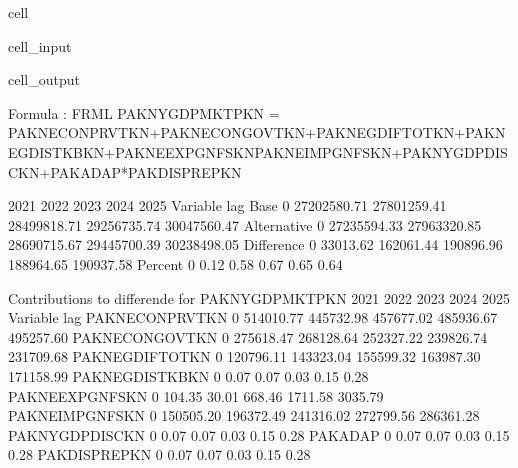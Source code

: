\documentclass[letterpaper,10pt,english]{jupyterBook}
\begin{document}
\begin{sphinxuseclass}{cell}\begin{sphinxVerbatimInput}

\begin{sphinxuseclass}{cell_input}
\begin{sphinxVerbatim}[commandchars=\\\{\}]
 
    \PYG{p}{[}\PYG{p}{]}  
\end{sphinxVerbatim}

\end{sphinxuseclass}\end{sphinxVerbatimInput}
\begin{sphinxVerbatimOutput}

\begin{sphinxuseclass}{cell_output}
\begin{sphinxVerbatim}[commandchars=\\\{\}]
Formula        : FRML  \PYGZlt{}\PYGZgt{} PAKNYGDPMKTPKN = PAKNECONPRVTKN+PAKNECONGOVTKN+PAKNEGDIFTOTKN+PAKNEGDISTKBKN+PAKNEEXPGNFSKN\PYGZhy{}PAKNEIMPGNFSKN+PAKNYGDPDISCKN+PAKADAP*PAKDISPREPKN \PYGZdl{} 

                       2021        2022        2023        2024        2025
Variable    lag                                                            
Base        0   27202580.71 27801259.41 28499818.71 29256735.74 30047560.47
Alternative 0   27235594.33 27963320.85 28690715.67 29445700.39 30238498.05
Difference  0      33013.62   162061.44   190896.96   188964.65   190937.58
Percent     0          0.12        0.58        0.67        0.65        0.64

 Contributions to differende for  PAKNYGDPMKTPKN
                         2021       2022       2023       2024       2025
Variable       lag                                                       
PAKNECONPRVTKN 0   \PYGZhy{}514010.77 \PYGZhy{}445732.98 \PYGZhy{}457677.02 \PYGZhy{}485936.67 \PYGZhy{}495257.60
PAKNECONGOVTKN 0    275618.47  268128.64  252327.22  239826.74  231709.68
PAKNEGDIFTOTKN 0    120796.11  143323.04  155599.32  163987.30  171158.99
PAKNEGDISTKBKN 0        \PYGZhy{}0.07      \PYGZhy{}0.07       0.03       0.15      \PYGZhy{}0.28
PAKNEEXPGNFSKN 0       104.35     \PYGZhy{}30.01    \PYGZhy{}668.46   \PYGZhy{}1711.58   \PYGZhy{}3035.79
PAKNEIMPGNFSKN 0    150505.20  196372.49  241316.02  272799.56  286361.28
PAKNYGDPDISCKN 0        \PYGZhy{}0.07      \PYGZhy{}0.07       0.03       0.15      \PYGZhy{}0.28
PAKADAP        0        \PYGZhy{}0.07      \PYGZhy{}0.07       0.03       0.15      \PYGZhy{}0.28
PAKDISPREPKN   0        \PYGZhy{}0.07      \PYGZhy{}0.07       0.03       0.15      \PYGZhy{}0.28


\end{sphinxVerbatim}
\end{sphinxuseclass}
\end{sphinxVerbatimOutput}
\end{sphinxuseclass}
\end{document}
